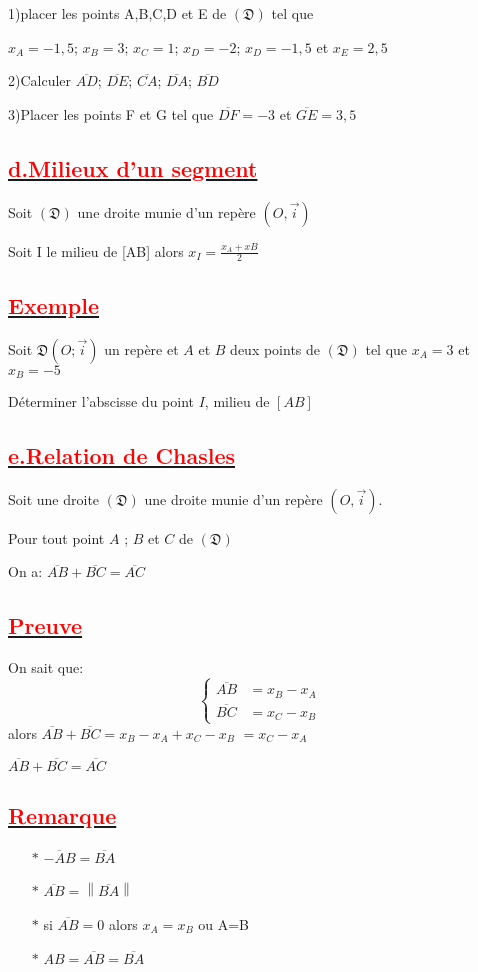 \documentclass[12pt]{article}
\begin{document}
1)placer les points A,B,C,D et E de $(\mathfrak{D})$ tel que 

$x_{A}=-1,5$; $x_{B}=3$; $x_{C}=1$; $x_{D}=-2$; $x_{D}=-1,5$ et $x_{E}=2,5$

2)Calculer $\overline{AD}$; $\overline{DE}$; $\overline{CA}$; $\overline{DA}$; $\overline{BD}$

3)Placer les points F et G tel que $\overline{DF}=-3$ et $\overline{GE}=3,5$
\subsection*{\underline{\textcolor{red}{\textbf{d.Milieux d'un segment}}}}
Soit $(\mathfrak{D})$ une droite munie d'un repère $(O,\vec{i})$

Soit I le milieu de [AB] alors $x_{I}=\frac{x_{A}+x{B}}{2}$

\subsection*{\underline{\textcolor{red}{\textbf{Exemple}}}}
Soit $\mathfrak{D}(O;\vec{i})$ un repère et $A$ et $B$ deux points de $(\mathfrak{D})$ tel que $x_{A}=3$ et $x_{B}=-5$

Déterminer l'abscisse du point $I$, milieu de $[AB]$
\subsection*{\underline{\textcolor{red}{\textbf{e.Relation de Chasles}}}}
Soit une droite $(\mathfrak{D})$ une droite munie d'un repère $(O,\vec{i})$.

Pour tout point $A$ ; $B$ et $C$ de $(\mathfrak{D})$ 

On a: $\overline{AB}+\overline{BC}=\overline{AC}$
\subsection*{\underline{\textcolor{red}{\textbf{Preuve}}}}
On sait que: \[
    \begin{cases}
        \overline{AB} &= x_{B}-x_{A} \\
        \overline{BC} &= x_{C}-x_{B}
    \end{cases}
    \]
alors $\overline{AB}+\overline{BC}=x_{B}-x_{A}+x_{C}-x_{B}$
$=x_{C}-x_{A}$

$\overline{AB}+\overline{BC}=\overline{AC}$
\subsection*{\underline{\textcolor{red}{\textbf{Remarque}}}}
\begin{itemize}
    \item[$\ast $] $\overline{-AB}=\overline{BA}$
    \item[$\ast $] $\overline{AB}=\left\lVert \overline{BA} \right\rVert $
    \item[$\ast $] si $\overline{AB}=0$ alors $x_{A}=x_{B}$ ou A=B
    \item[$\ast $] $AB=\overline{AB}=\overline{BA}$
\end{itemize}
\end{document}
